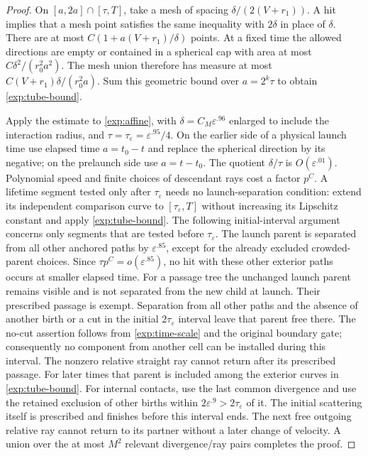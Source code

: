 \begin{proof}
On $[a,2a]\cap[\tau,T]$, take a mesh of spacing
$\delta/(2(V+r_1))$.  A hit implies that a mesh point satisfies the same
inequality with $2\delta$ in place of $\delta$.  There are at most
$C(1+a(V+r_1)/\delta)$ points.  At a fixed time the allowed directions are
empty or contained in a spherical cap with area at most
$C\delta^2/(r_0^2a^2)$.  The mesh union therefore has measure at most
$C(V+r_1)\delta/(r_0^2a)$.  Sum this geometric bound over
$a=2^k\tau$ to obtain \eqref{exp:tube-bound}.

Apply the estimate to \eqref{exp:affine}, with
$\delta=C_M\varepsilon^{.96}$ enlarged to include the interaction radius,
and $\tau=\tau_\varepsilon=\varepsilon^{.95}/4$.  On the earlier side of a physical
launch time use elapsed time $a=t_0-t$ and replace the spherical direction
by its negative; on the prelaunch side use $a=t-t_0$.  The quotient $\delta/\tau$ is
$O(\varepsilon^{.01})$.  Polynomial speed and finite choices of descendant
rays cost a factor $p^C$.
A lifetime segment tested only after $\tau_\varepsilon$ needs no
launch-separation condition: extend its independent comparison curve to
$[\tau_\varepsilon,T]$ without increasing its Lipschitz constant and apply
\eqref{exp:tube-bound}. The following initial-interval argument concerns
only segments that are tested before $\tau_\varepsilon$.
The launch parent is separated from all other
anchored paths by $\varepsilon^{.85}$, except for the already excluded
crowded-parent choices.  Since $\tau p^C=o(\varepsilon^{.85})$, no hit with these other exterior
paths occurs at smaller elapsed time.  For a passage tree the unchanged
launch parent remains visible and is not separated from the new child at
launch.  Their prescribed passage is exempt.  Separation from all other
paths and the absence of another birth or a cut in the initial
$2\tau_\varepsilon$ interval leave that parent free there.  The no-cut
assertion follows from \eqref{exp:time-scale} and the original boundary
gate; consequently no component from another cell can be installed during
this interval.  The nonzero relative straight ray cannot return after its
prescribed passage.  For later times that parent
is included among the exterior curves in \eqref{exp:tube-bound}.
For internal contacts, use the last
common divergence and use the retained exclusion of other births within
$2\varepsilon^{.9}>2\tau_\varepsilon$ of it.  The initial scattering itself is prescribed and finishes before this
interval ends.  The next free outgoing relative ray cannot return to its
partner without a later change of velocity.  A union over the at most
$M^2$ relevant divergence/ray pairs completes the proof.
\end{proof}

